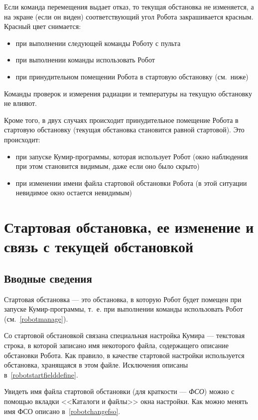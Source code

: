 \documentclass[12pt,a4paper]{article}
\begin{document}
Если команда перемещения выдает отказ, то текущая обстановка не изменяется, а на экране (если он виден) соответствующий угол Робота закрашивается красным. Красный цвет снимается:
\begin{itemize}
\item при выполнении следующей команды Роботу с пульта
\item при выполнении команды \textsf{использовать Робот}
\item при принудительном помещении Робота в стартовую обстановку (см.~ниже)
\end{itemize}

Команды проверок и измерения радиации и температуры на текущую обстановку не влияют.

Кроме того, в двух случаях происходит принудительное помещение Робота в стартовую обстановку (текущая обстановка становится равной стартовой). Это происходит:
\begin{itemize}
\item при запуске Кумир-программы, которая использует Робот (окно наблюдения при этом становится видимым, даже если оно было скрыто)
\item при изменении имени файла стартовой обстановки Робота (в этой ситуации невидимое окно остается невидимым)
\end{itemize}

\section{Стартовая обстановка, ее изменение и связь с текущей обстановкой}
\label{robotstartfield}

\subsection{Вводные сведения}

Стартовая обстановка --- это обстановка, в которую Робот будет помещен при запуске Кумир-программы, т.~е. при выполнении команды \textsf{использовать Робот} (см.~\ref{robotmanage}).

Со стартовой обстановкой связана специальная настройка Кумира --- текстовая строка, в которой записано имя некоторого файла, содержащего описание обстановки Робота.  Как правило, в качестве стартовой настройки используется обстановка, хранящаяся в этом файле. Исключения описаны в~\ref{robotstartfielddefine}.

Увидеть имя файла стартовой обстановки (для краткости --- \emph{ФСО}) можно с помощью вкладки <<Каталоги и файлы>> окна настройки. Как можно менять имя ФСО описано в~\ref{robotchangefso}.
	
\end{document}
